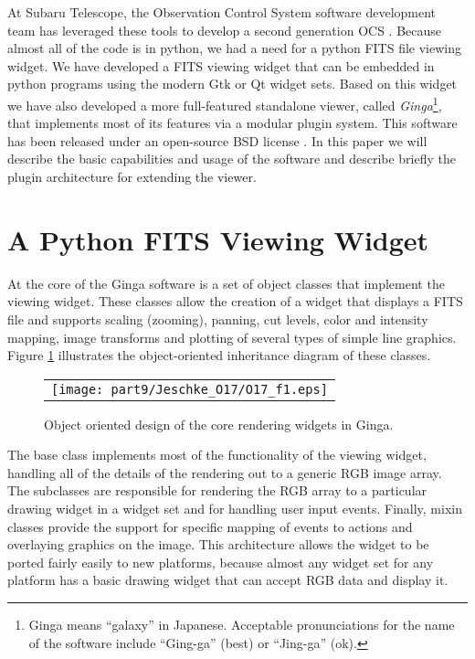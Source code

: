 At Subaru Telescope, the Observation Control System software development team has leveraged these tools to develop a second generation OCS \citep{Jeschke10B}. Because almost all of the code is in python, we had a need for a python FITS file viewing widget.  We have developed a FITS viewing widget that can be embedded in python programs using the modern Gtk or Qt widget sets. Based on this widget we have also developed a more full-featured standalone viewer, called \emph{Ginga}\footnote{Ginga means ``galaxy'' in Japanese. Acceptable pronunciations for the name of the software include ``Ging-ga'' (best) or ``Jing-ga'' (ok).}, that implements most of its features via a modular plugin system. This software has been released under an open-source BSD license \citep{Jeschke12}. In this paper we will describe the basic capabilities and usage of the software and describe briefly the plugin architecture for extending the viewer.

\section{A Python FITS Viewing Widget}
At the core of the Ginga software is a set of object classes that implement the viewing widget.  These classes allow the creation of a widget that displays a FITS file and supports scaling (zooming), panning, cut levels, color and intensity mapping, image transforms and plotting of several types of simple line graphics. Figure \ref{fig:onion} illustrates the object-oriented inheritance diagram of these classes.
\label{sec:coreclasses}
\begin{figure}
  \begin{center}
    \begin{tabular}{c}
      \texttt{[image: part9/Jeschke\_O17/O17\_f1.eps]}
    \end{tabular}
  \end{center}
  \caption[example] 
          { \label{fig:onion} 
            Object oriented design of the core rendering widgets in Ginga.} 
\end{figure} 
The base class implements most of the functionality of the viewing widget, handling all of the details of the rendering out to a generic RGB image array. The subclasses are responsible for rendering the RGB array to a particular drawing widget in a widget set and for handling user input events. Finally, mixin classes \citep{mixins} provide the support for specific mapping of events to actions and overlaying graphics on the image. This architecture allows the widget to be ported fairly easily to new platforms, because almost any widget set for any platform has a basic drawing widget that can accept RGB data and display it.


